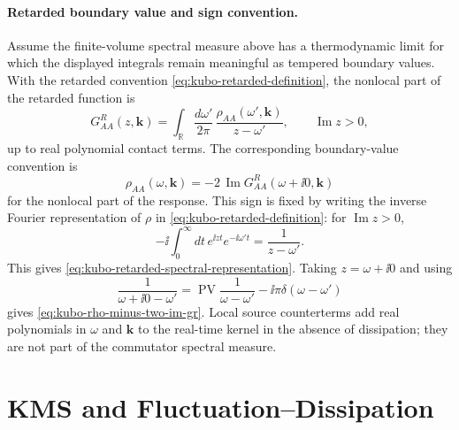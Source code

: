 \paragraph{Retarded boundary value and sign convention.}
Assume the finite-volume spectral measure above has a thermodynamic limit for
which the displayed integrals remain meaningful as tempered boundary values.
With the retarded convention \eqref{eq:kubo-retarded-definition}, the nonlocal
part of the retarded function is
\begin{equation}
  G^R_{AA}(z,\mathbf k)
  =
  \int_{\mathbb R}\frac{d\omega'}{2\pi}\,
  \frac{\rho_{AA}(\omega',\mathbf k)}{z-\omega'},
  \qquad
  \operatorname{Im}z>0,
  \label{eq:kubo-retarded-spectral-representation}
\end{equation}
up to real polynomial contact terms.  The corresponding boundary-value
convention is
\begin{equation}
  \rho_{AA}(\omega,\mathbf k)
  =
  -2\,\operatorname{Im}G^R_{AA}(\omega+\ii0,\mathbf k)
  \label{eq:kubo-rho-minus-two-im-gr}
\end{equation}
for the nonlocal part of the response.  This sign is fixed by writing the
inverse Fourier representation of \(\rho\) in
\eqref{eq:kubo-retarded-definition}: for \(\operatorname{Im}z>0\),
\[
  -\ii\int_0^\infty dt\,e^{\ii zt}e^{-\ii\omega't}
  =
  \frac{1}{z-\omega'} .
\]
This gives \eqref{eq:kubo-retarded-spectral-representation}.  Taking
\(z=\omega+\ii0\) and using
\[
  \frac{1}{\omega+\ii0-\omega'}
  =
  \operatorname{PV}\frac{1}{\omega-\omega'}
  -
  \ii\pi\delta(\omega-\omega')
\]
gives \eqref{eq:kubo-rho-minus-two-im-gr}.  Local source counterterms add
real polynomials in \(\omega\) and \(\mathbf k\) to the real-time kernel in
the absence of dissipation; they are not part of the commutator spectral
measure.

\section{KMS and Fluctuation--Dissipation}

